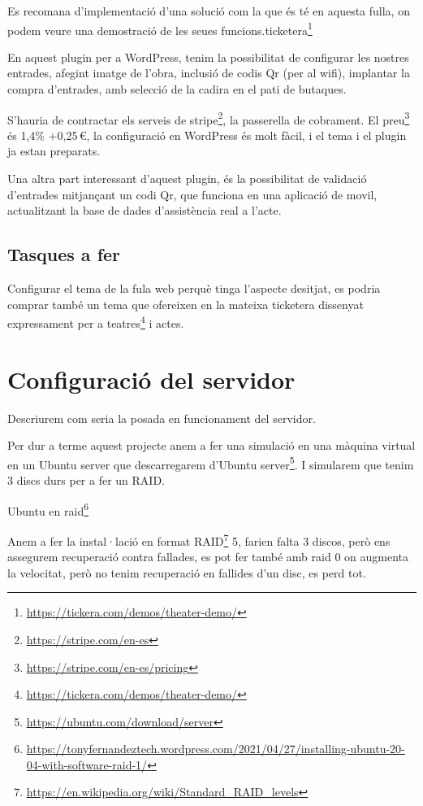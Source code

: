\documentclass[
  10pt,
]{krantz}
\DeclareRobustCommand{\href}[2]{#2\footnote{\url{#1}}}
\begin{document}
Es recomana d'implementació d'una solució com la que és té en aquesta fulla, on podem veure una demostració de les seues funcions.\href{https://tickera.com/demos/theater-demo/}{ticketera}

En aquest plugin per a WordPress, tenim la possibilitat de configurar les nostres entrades, afegint imatge de l'obra, inclusió de codis Qr (per al wifi), implantar la compra d'entrades, amb selecció de la cadira en el pati de butaques.

S'hauria de contractar els serveis de \href{https://stripe.com/en-es}{stripe}, la passerella de cobrament. El \href{https://stripe.com/en-es/pricing}{preu} és 1,4\% +0,25\,€, la configuració en WordPress és molt fàcil, i el tema i el plugin ja estan preparats.

Una altra part interessant d'aquest plugin, és la possibilitat de validació d'entrades mitjançant un codi Qr, que funciona en una aplicació de movil, actualitzant la base de dades d'assistència real a l'acte.

\hypertarget{tasques-a-fer}{%
\section{Tasques a fer}\label{tasques-a-fer}}

Configurar el tema de la fula web perquè tinga l'aspecte desitjat, es podria comprar també un tema que ofereixen en la mateixa ticketera dissenyat expressament per a \href{https://tickera.com/demos/theater-demo/}{teatres} i actes.

\hypertarget{configuraciuxf3-del-servidor}{%
\chapter{Configuració del servidor}\label{configuraciuxf3-del-servidor}}

Descriurem com seria la posada en funcionament del servidor.

Per dur a terme aquest projecte anem a fer una simulació en una màquina virtual en un Ubuntu server que descarregarem \href{https://ubuntu.com/download/server}{d'Ubuntu server}. I simularem que tenim 3 discs durs per a fer un RAID.

\href{https://tonyfernandeztech.wordpress.com/2021/04/27/installing-ubuntu-20-04-with-software-raid-1/}{Ubuntu en raid}

Anem a fer la instal·lació en format \href{https://en.wikipedia.org/wiki/Standard_RAID_levels}{RAID} 5, farien falta 3 discos, però ens assegurem recuperació contra fallades, es pot fer també amb raid 0 on augmenta la velocitat, però no tenim recuperació en fallides d'un disc, es perd tot.
\end{document}
